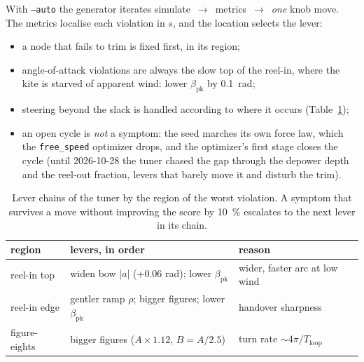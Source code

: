 \documentclass[11pt,a4paper]{article}
\newcommand{\code}[1]{\texttt{\small #1}}
\begin{document}
With \code{--auto} the generator iterates
simulate~$\to$~metrics~$\to$~\emph{one} knob move. The metrics localise
each violation in $s$, and the location selects the lever:
\begin{itemize}
  \item a node that fails to trim is fixed first, in its region;
  \item angle-of-attack violations are always the slow top of the reel-in,
        where the kite is starved of apparent wind: lower $\beta_\mathrm{pk}$ by
        \SI{0.1}{rad};
  \item steering beyond the slack is handled according to where it occurs
        (Table~\ref{tab:levers});
  \item an open cycle is \emph{not} a symptom: the seed marches its own
        force law, which the \code{free\_speed} optimizer drops, and the
        optimizer's first stage closes the cycle (until 2026-10-28 the tuner
        chased the gap through the depower depth and the reel-out fraction,
        levers that barely move it and disturb the trim).
\end{itemize}

\begin{table}[H]
  \centering\small
  \caption{Lever chains of the tuner by the region of the worst violation.
  A symptom that survives a move without improving the score by
  \SI{10}{\percent} escalates to the next lever in its chain.}
  \label{tab:levers}
  \begin{tabular}{lll}
    \toprule
    region & levers, in order & reason \\
    \midrule
    reel-in top & widen bow $|a|$ (+0.06 rad); lower $\beta_\mathrm{pk}$ & wider, faster arc at low wind \\
    reel-in edge & gentler ramp $\rho$; bigger figures; lower $\beta_\mathrm{pk}$ & handover sharpness \\
    figure-eights & bigger figures ($A\times1.12$, $B=A/2.5$) & turn rate $\sim4\pi/T_\mathrm{loop}$ \\
    \bottomrule
  \end{tabular}
\end{table}
\end{document}
